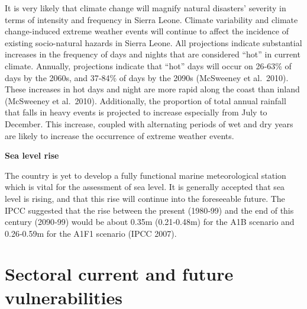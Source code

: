 \documentclass[
]{book}
\begin{document}
It is very likely that climate change will magnify natural disasters' severity in terms of intensity and frequency in Sierra Leone. Climate variability and climate change-induced extreme weather events will continue to affect the incidence of existing socio-natural hazards in Sierra Leone. All projections indicate substantial increases in the frequency of days and nights that are considered ``hot'' in current climate. Annually, projections indicate that ``hot'' days will occur on 26‐63\% of days by the 2060s, and 37‐84\% of days by the 2090s (McSweeney et al.~2010). These increases in hot days and night are more rapid along the coast than inland (McSweeney et al.~2010). Additionally, the proportion of total annual rainfall that falls in heavy events is projected to increase especially from July to December. This increase, coupled with alternating periods of wet and dry years are likely to increase the occurrence of extreme weather events.

\textbf{Sea level rise}

The country is yet to develop a fully functional marine meteorological station which is vital for the assessment of sea level. It is generally accepted that sea level is rising, and that this rise will continue into the foreseeable future.
The IPCC suggested that the rise between the present (1980‐99) and the end of this century (2090‐99) would be about 0.35m (0.21‐0.48m) for the A1B scenario and 0.26‐0.59m for the A1F1 scenario (IPCC 2007).

\hypertarget{sectoral-current-and-future-vulnerabilities}{%
\section{Sectoral current and future vulnerabilities}\label{sectoral-current-and-future-vulnerabilities}}
\end{document}
